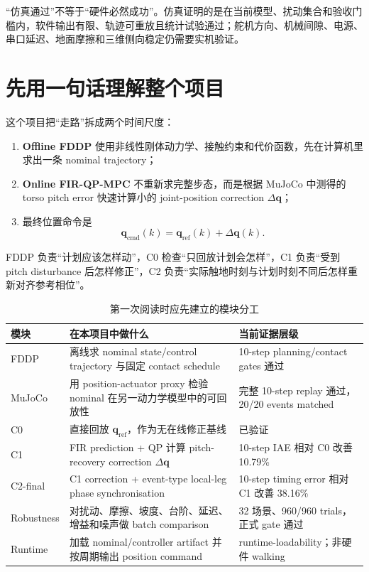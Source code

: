 \documentclass[UTF8,11pt,a4paper]{ctexart}
\begin{document}
\begin{warningbox}
“仿真通过”不等于“硬件必然成功”。仿真证明的是在当前模型、扰动集合和验收门槛内，软件输出有限、轨迹可重放且统计试验通过；舵机方向、机械间隙、电源、串口延迟、地面摩擦和三维侧向稳定仍需要实机验证。
\end{warningbox}

\section{先用一句话理解整个项目}\label{sec:one_sentence}

这个项目把“走路”拆成两个时间尺度：

\begin{enumerate}
  \item \textbf{Offline FDDP} 使用非线性刚体动力学、接触约束和代价函数，先在计算机里求出一条 nominal trajectory；
  \item \textbf{Online FIR-QP-MPC} 不重新求完整步态，而是根据 MuJoCo 中测得的 torso pitch error 快速计算小的 joint-position correction $\Delta\bm q$；
  \item 最终位置命令是
  \begin{equation}
      \bm q_{\mathrm{cmd}}(k)=\bm q_{\mathrm{ref}}(k)+\Delta\bm q(k).
      \label{eq:qcmd}
  \end{equation}
\end{enumerate}

FDDP 负责“计划应该怎样动”，C0 检查“只回放计划会怎样”，C1 负责“受到 pitch disturbance 后怎样修正”，C2 负责“实际触地时刻与计划时刻不同后怎样重新对齐参考相位”。

\begin{table}[htbp]
\centering
\caption{第一次阅读时应先建立的模块分工}
\begin{tabularx}{\linewidth}{@{}p{2.25cm}X p{3.0cm}@{}}
\toprule
模块 & 在本项目中做什么 & 当前证据层级 \\
\midrule
FDDP & 离线求 nominal state/control trajectory 与固定 contact schedule & 10-step planning/contact gates 通过 \\
MuJoCo & 用 position-actuator proxy 检验 nominal 在另一动力学模型中的可回放性 & 完整 10-step replay 通过，20/20 events matched \\
C0 & 直接回放 $\bm q_{\mathrm{ref}}$，作为无在线修正基线 & 已验证 \\
C1 & FIR prediction + QP 计算 pitch-recovery correction $\Delta\bm q$ & 10-step IAE 相对 C0 改善 10.79\% \\
C2-final & C1 correction + event-type local-leg phase synchronisation & 10-step timing error 相对 C1 改善 38.16\% \\
Robustness & 对扰动、摩擦、坡度、台阶、延迟、增益和噪声做 batch comparison & 32 场景、960/960 trials，正式 gate 通过 \\
Runtime & 加载 nominal/controller artifact 并按周期输出 position command & runtime-loadability；非硬件 walking \\
\bottomrule
\end{tabularx}
\end{table}
\end{document}
